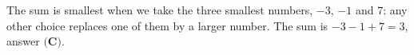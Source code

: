 The sum is smallest when we take the three smallest numbers, $-3$, $-1$ and $7$: any other choice replaces one of them by a larger number. The sum is $-3-1+7=\boxed{3}$, answer $\textbf{(C)}$.
